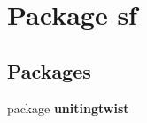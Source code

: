 \section{Package sf}
\label{namespacesf}
\subsection*{Packages}
\begin{DoxyCompactItemize}
\item 
package \textbf{ unitingtwist}
\end{DoxyCompactItemize}
